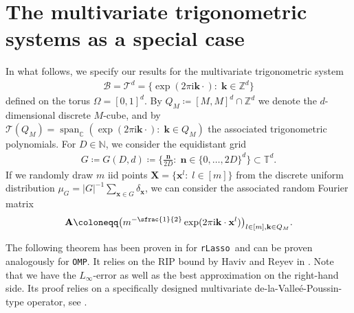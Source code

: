 \documentclass[11pt,reqno, a4paper]{article}
\numberwithin{equation}{section}
\newcommand{\C}{\mathbb{C}}
\newcommand{\rlasso}{\texttt{rLasso}}
\newcommand{\omp}{\texttt{OMP}}
\DeclareMathOperator{\spann}{span}
\begin{document}
\section{The multivariate trigonometric systems as a special case}\label{sec:Fourier}

In what follows, we specify our results for the multivariate trigonometric system
\begin{gather}
\mathcal B= \mathcal{T}^d = \{\exp(2\pi\mathrm{i}\mathbf{k}\cdot)\colon \; \mathbf{k}\in \mathbb{Z}^d\}
\end{gather}
defined on the torus $\Omega= [0, 1]^d$.
By $Q_M\coloneqq [M,M]^d\cap\mathbb{Z}^d$ we denote the $d$-dimensional discrete $M$-cube, and by $\mathcal{T}(Q_M) = \spann_\C(\exp(2\pi\mathrm{i}\mathbf{k}\cdot)\colon \; \mathbf{k}\in Q_M)$ the associated trigonometric polynomials.
For $D \in \mathbb{N}$, we consider the equidistant grid
\begin{gather}
    G\coloneqq G(D,d) \coloneqq \Big\{ \frac{\mathbf{n}}{2D}\colon \; \mathbf{n} \in \{0, \ldots, 2D\}^d \Big\} \subset \mathbb{T}^d.
\end{gather}
If we randomly draw $m$ iid points $\mathbf{X} = \{\mathbf{x}^l\colon \; l\in[m]\}$ from the discrete uniform distribution $\mu_G = \lvert G\rvert^{-1} \sum_{\mathbf{x}\in G} \delta_\mathbf{x}$, we can consider the associated random Fourier matrix
\begin{equation}\label{eq:FourierMat}
    \mathbf{A} \coloneqq\big(m^{-\sfrac{1}{2}} \exp(2\pi\mathrm{i}\mathbf{k}\cdot \mathbf{x}^{l})\big)_{l\in[m],\mathbf{k}\in Q_M}.
\end{equation} 

The following theorem has been proven in \cite{MPU25_1} for \rlasso \ and can be proven analogously for \omp. It relies on the RIP bound by Haviv and Reyev in \cite{HaRe17}. 
Note that we have the $L_\infty$-error as well as the best approximation on the right-hand side.
Its proof relies on a specifically designed multivariate de-la-Valle{\'e}-Poussin-type operator, see \cite{JUV23}.
\end{document}
